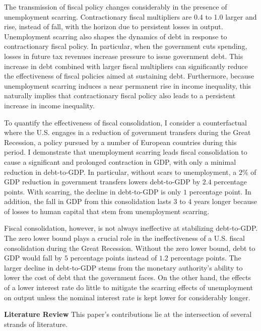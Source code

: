 The transmission of fiscal policy changes considerably in the presence of unemployment scarring. Contractionary fiscal multipliers are 0.4 to 1.0 larger and rise, instead of fall, with the horizon due to persistent losses in output. Unemployment scarring also shapes the dynamics of debt in response to contractionary fiscal policy. In particular, when the government cuts spending, losses in future tax revenues increase pressure to issue government debt. This increase in debt combined with larger fiscal multipliers can significantly reduce the effectiveness of fiscal policies aimed at sustaining debt. Furthermore, because unemployment scarring induces a near permanent rise in income inequality, this naturally implies that contractionary fiscal policy also leads to a persistent increase in income inequality.

To quantify the effectiveness of fiscal consolidation, I consider a counterfactual where the U.S. engages in a reduction of government transfers during the Great Recession, a policy pursued by a number of European countries during this period. I demonstrate that unemployment scarring leads fiscal consolidation to cause a significant and prolonged contraction in GDP, with only a minimal reduction in debt-to-GDP. In particular, without scars to unemployment, a  $2\%$ of GDP reduction in government transfers lowers debt-to-GDP by $2.4$ percentage points. With scarring, the decline in debt-to-GDP is only $1$ percentage point. In addition, the fall in GDP from this consolidation lasts 3 to 4 years longer because of losses to human capital that stem from unemployment scarring.

Fiscal consolidation, however, is not always ineffective at stabilizing debt-to-GDP. The zero lower bound plays a crucial role in the ineffectiveness of a U.S. fiscal consolidation during the Great Recession. Without the zero lower bound, debt to GDP would fall by $5$ percentage points instead of $1.2$ percentage points. The larger decline in debt-to-GDP stems from the monetary authority's ability to lower the cost of debt that the government faces. On the other hand, the effects of a lower interest rate do little to mitigate the scarring effects of unemployment on output unless the nominal interest rate is kept lower for considerably longer. 

\textbf{Literature Review} This paper's contributions lie at the intersection of several strands of literature. 

